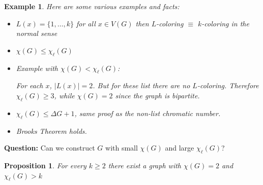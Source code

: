 \documentclass[a4paper]{article}
\theoremstyle{plain}
\newtheorem{proposition}[lemma]{Proposition}
\theoremstyle{myremark}
\newtheorem{example}[lemma]{Example}
\begin{document}
\begin{example}
Here are some various examples and facts:

\begin{itemize}
\item $L(x)=\{1,\ldots,k\}$ for all $x\in V(G)$ then $L$-coloring $\equiv$ $k$-coloring in the normal sense
\item $\chi(G)\leq \chi_{\ell}(G)$
\item Example with $\chi(G) < \chi_{\ell}(G)$:
\begin{center}
\end{center}
For each $x$, $|L(x)|=2$. But for these list there are no $L$-coloring. Therefore $\chi_{\ell}(G)\geq 3$, while $\chi(G)=2$ since the graph is bipartite.
\item $\chi_{\ell}(G)\leq \Delta G+1$, same proof as the non-list chromatic number.
\item Brooks Theorem holds.
\end{itemize}
\end{example}

\textbf{Question:} Can we construct $G$ with small $\chi(G)$ and large $\chi_{\ell}(G)$?

\begin{proposition}
For every $k\geq 2$ there exist a graph with $\chi(G)=2$ and $\chi_{\ell}(G)>k$
\end{proposition}
\end{document}
